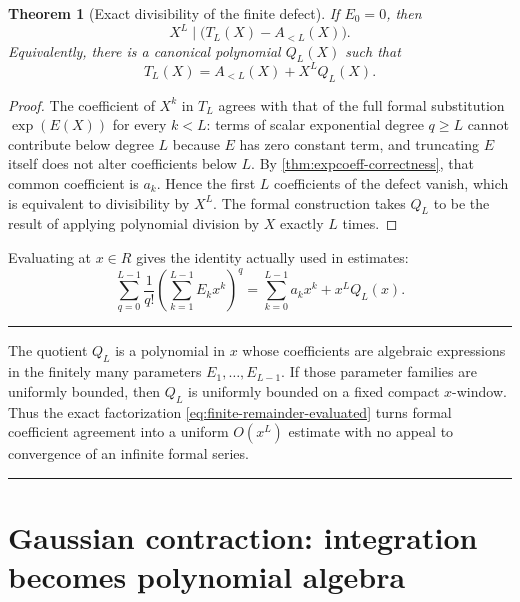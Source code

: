 \documentclass[11pt,oneside]{article}
\newtheorem{theorem}{Theorem}[section]
\theoremstyle{definition}
\theoremstyle{remark}
\newenvironment{boxedremark}{%
  \par\smallskip\noindent\begin{center}\begin{minipage}{0.94\textwidth}%
  \color{black}\hrule\vspace{0.6em}\small
}{%
  \vspace{0.6em}\hrule\end{minipage}\end{center}\smallskip
}
\begin{document}
\begin{theorem}[Exact divisibility of the finite defect]
\label{thm:finite-defect-divisibility}
If $E_0=0$, then
\begin{equation}
 X^L\mid\bigl(T_L(X)-A_{<L}(X)\bigr).
 \label{eq:defect-divisibility}
\end{equation}
Equivalently, there is a canonical polynomial $Q_L(X)$ such that
\begin{equation}
 T_L(X)=A_{<L}(X)+X^LQ_L(X).
 \label{eq:exact-finite-remainder-polynomial}
\end{equation}
\end{theorem}

\begin{proof}
The coefficient of $X^k$ in $T_L$ agrees with that of the full formal substitution
$\exp(E(X))$ for every $k<L$: terms of scalar exponential degree $q\ge L$ cannot contribute
below degree $L$ because $E$ has zero constant term, and truncating $E$ itself does not alter
coefficients below $L$.  By \cref{thm:expcoeff-correctness}, that common coefficient is
$a_k$.  Hence the first $L$ coefficients of the defect vanish, which is equivalent to
divisibility by $X^L$.  The formal construction takes $Q_L$ to be the result of applying
polynomial division by $X$ exactly $L$ times.
\end{proof}

Evaluating at $x\in R$ gives the identity actually used in estimates:
\begin{equation}
 \sum_{q=0}^{L-1}\frac1{q!}
 \left(\sum_{k=1}^{L-1}E_kx^k\right)^q
 =\sum_{k=0}^{L-1}a_kx^k+x^LQ_L(x).
 \label{eq:finite-remainder-evaluated}
\end{equation}

\begin{boxedremark}
The quotient $Q_L$ is a polynomial in $x$ whose coefficients are algebraic expressions in
the finitely many parameters $E_1,\ldots,E_{L-1}$.  If those parameter families are uniformly
bounded, then $Q_L$ is uniformly bounded on a fixed compact $x$-window.  Thus the exact
factorization \eqref{eq:finite-remainder-evaluated} turns formal coefficient agreement into a
uniform $O(x^L)$ estimate with no appeal to convergence of an infinite formal series.
\end{boxedremark}

\section{Gaussian contraction: integration becomes polynomial algebra}
\label{sec:gaussian-contraction}
\end{document}
